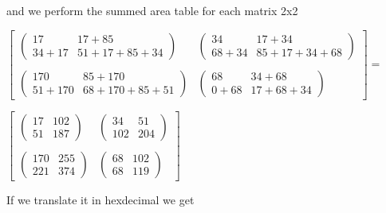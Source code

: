       and we perform the summed area table for each matrix 2x2
      \begin{center}
      	$ \begin{bmatrix}
      	\begin{pmatrix}
      	17 &17+85\\
      	34+17& 51+17+85+34
      	\end{pmatrix}&
      	\begin{pmatrix}
      	34 & 17+34\\
      	68+34& 85+17+34+68 
      	\end{pmatrix}\\
      	&\\
      	\begin{pmatrix}
      	170&85+170\\
      	51+170&68+170+85+51
      	\end{pmatrix}&
      	\begin{pmatrix}
      	68  &34+68\\
      	0+68 & 17+68+34
      	\end{pmatrix}
      	\end{bmatrix} =$
      \end{center}\bigskip
      \begin{center}
      	$\begin{bmatrix}
      	\begin{pmatrix}
      	17 &102\\
      	51& 187
      	\end{pmatrix}&
      	\begin{pmatrix}
      	34 & 51\\
      	102& 204 
      	\end{pmatrix}\\
      	&\\
      	\begin{pmatrix}
      	170&255\\
      	221&374
      	\end{pmatrix}&
      	\begin{pmatrix}
      	68  &102\\
      	68 & 119
      	\end{pmatrix}
      	\end{bmatrix}$
      \end{center}
      \bigskip
      If we translate it in hexdecimal we get

